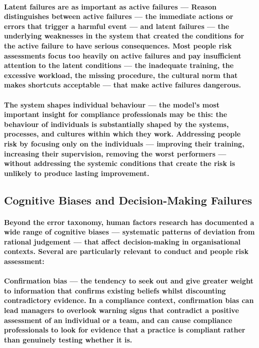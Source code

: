 \paragraph{\textbf{Latent failures are as important as active failures} — Reason distinguishes between \textbf{active failures} — the immediate actions or errors that trigger a harmful event — and \textbf{latent failures} — the underlying weaknesses in the system that created the conditions for the active failure to have serious consequences. Most people risk assessments focus too heavily on active failures and pay insufficient attention to the latent conditions — the inadequate training, the excessive workload, the missing procedure, the cultural norm that makes shortcuts acceptable — that make active failures dangerous.}
\paragraph{\textbf{The system shapes individual behaviour} — the model's most important insight for compliance professionals may be this: the behaviour of individuals is substantially shaped by the systems, processes, and cultures within which they work. Addressing people risk by focusing only on the individuals — improving their training, increasing their supervision, removing the worst performers — without addressing the systemic conditions that create the risk is unlikely to produce lasting improvement.}

\subsection{Cognitive Biases and Decision-Making Failures}
\paragraph{Beyond the error taxonomy, human factors research has documented a wide range of cognitive biases — systematic patterns of deviation from rational judgement — that affect decision-making in organisational contexts. Several are particularly relevant to conduct and people risk assessment:}
\paragraph{\textbf{Confirmation bias} — the tendency to seek out and give greater weight to information that confirms existing beliefs whilst discounting contradictory evidence. In a compliance context, confirmation bias can lead managers to overlook warning signs that contradict a positive assessment of an individual or a team, and can cause compliance professionals to look for evidence that a practice is compliant rather than genuinely testing whether it is.}
